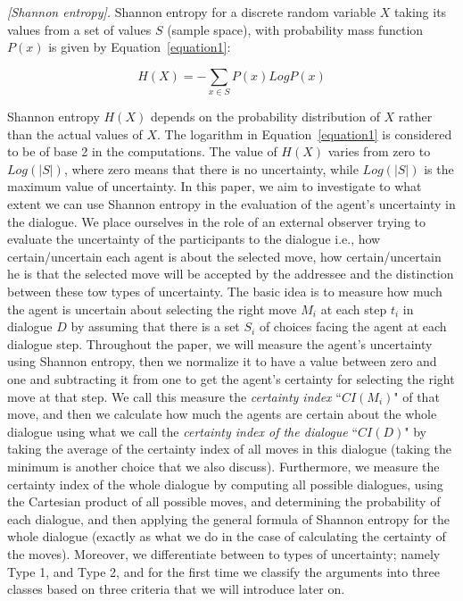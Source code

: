 \begin{definition}{\emph{[Shannon entropy]. }} \label{entropy}
Shannon entropy for a discrete random variable \emph{$X$} taking its values from a set of values \emph{$S$} (sample space),
with probability mass function \emph{$P(x)$} is given by Equation~\ref{equation1}:

\begin{equation}\label{equation1}
H(X) = - \sum_{x\in S} P(x)Log P(x)
\end{equation}

\end{definition}

Shannon entropy $H(X)$ depends on the probability distribution of $X$ rather than the actual values of $X$. The logarithm in
Equation~\ref{equation1} is considered to be of base 2 in the computations. The value of $H(X)$ varies from zero to $Log(|S|)$,
where zero means that there is no uncertainty, while $Log(|S|)$ is the maximum value of uncertainty. In this paper, we aim to
investigate to what extent we can use Shannon entropy in the evaluation of the agent's uncertainty in the dialogue. We place
ourselves in the role of an external observer trying to evaluate the uncertainty of the participants to the dialogue i.e., how
certain/uncertain each agent is about the selected move, how certain/uncertain he is that the selected move will be accepted by
the addressee and the distinction between these tow types of uncertainty. The basic idea is to measure how much the agent is
uncertain about selecting the right move $M_i$ at each step $t_i$ in dialogue $D$ by assuming that there is a set $S_i$ of choices
facing the agent at each dialogue step. Throughout the paper, we will measure the agent's uncertainty using Shannon entropy, then
we normalize it to have a value between zero and one and subtracting it from one to get the agent's certainty for selecting the right
move at that step. We call this measure the \emph{certainty index} ``$CI(M_i)$" of that move, and then we calculate how much the agents
are certain about the whole dialogue using what we call the \emph{certainty index of the dialogue} ``$CI(D)$" by taking the average of
the certainty index of all moves in this dialogue (taking the minimum is another choice that we also discuss).
Furthermore, we measure the certainty index of the whole dialogue by computing all possible dialogues, using the Cartesian product
of all possible moves, and determining the probability of each dialogue, and then applying the general formula of Shannon entropy
for the whole dialogue (exactly as what we do in the case of calculating the certainty of the moves). Moreover, we differentiate
between to types of uncertainty; namely Type 1, and Type 2, and for the first time we classify the arguments into three classes based on
three criteria that we will introduce later on.

